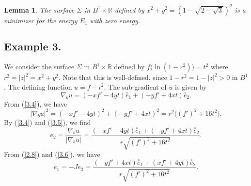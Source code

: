 \documentclass{amsart}
\newtheorem{lem}[theorem]{Lemma}
\theoremstyle{Corollary}
\numberwithin{equation}{section}
\begin{document}
\begin{lem}\label{lem3.3}
The surface 
$\Sigma$ in $B^1\times\mathbb{R}$ defined by 
$x^2+y^2=(1-\sqrt{2-\sqrt{3}})^2$ is a minimizer for the energy $E_1$ with zero energy.
\end{lem}









\subsection{Example 3.} 

We consider the surface $\Sigma$ in $B^1\times\mathbb{R}$ 
defined by $f\big(\ln(1-r^2)\big)=t^2$ where $r^2=|z|^2=x^2+y^2$. 
Note that this is well-defined, since $1-r^2=1-|z|^2>0$ in  $B^1$.
The defining function 
$u=f-t^2$. 
The sub-gradient of $u$ is given by 
\begin{equation}\label{3.4}
\nabla_b u=(-xf'-4yt)\overset{\circ}{e}_1
+(-yf'+4xt)\overset{\circ}{e}_2.
\end{equation}
From (\ref{3.4}), we have 
\begin{equation}\label{3.5}
|\nabla_b u|^2=(-xf'-4yt)^2+(-yf'+4xt)^2=r^2\big((f')^2+16t^2\big).
\end{equation}
By (\ref{3.4}) and (\ref{3.5}), we find 
\begin{equation}\label{3.6}
e_2=\frac{\nabla_b u}{|\nabla_b u|}
=\frac{(-xf'-4yt)\overset{\circ}{e}_1
+(-yf'+4xt)\overset{\circ}{e}_2}
{r\sqrt{(f')^2+16t^2}}.
\end{equation}
From (\ref{2.8}) and (\ref{3.6}), we have 
\begin{equation}\label{3.7}
e_1=-Je_2=\frac{(-yf'+4xt)\overset{\circ}{e}_1
+(xf'+4yt)\overset{\circ}{e}_2}
{r\sqrt{(f')^2+16t^2}}.
\end{equation}
\end{document}
